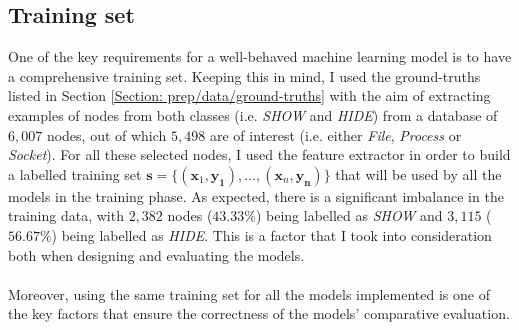 	\subsection{Training set} \label{Section: impl/ml/training-set}
	One of the key requirements for a well-behaved machine learning model is to have a comprehensive training set. Keeping this in mind, I used the ground-truths listed in Section \ref{Section: prep/data/ground-truths} with the aim of extracting examples of nodes from both classes (i.e. \textit{SHOW} and \textit{HIDE}) from a database of $6,007$ nodes, out of which $5,498$ are of interest (i.e. either \textit{File}, \textit{Process} or \textit{Socket}). For all these selected nodes, I used the feature extractor in order to build a labelled training set $\mathbf{s}=\{ (\mathbf{x}_1, \mathbf{y_1}), \dots, (\mathbf{x}_n, \mathbf{y_n}) \}$ that will be used by all the models in the training phase. As expected, there is a significant imbalance in the training data, with $2,382$ nodes ($43.33\%$) being labelled as \textit{SHOW} and $3,115$ ($56.67\%$) being labelled as \textit{HIDE}. This is a factor that I took into consideration both when designing and evaluating the models.
	\\ \\
	Moreover, using the same training set for all the models implemented is one of the key factors that ensure the correctness of the models' comparative evaluation. 
